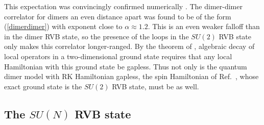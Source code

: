 \documentclass[11pt]{iopart}
\begin{document}
This expectation was convincingly confirmed numerically \cite{RVB1,RVB2}. The dimer-dimer correlator for dimers an even distance apart was found to be of the form (\ref{dimerdimer}) with
exponent close to $\alpha \approx 1.2$. This is an even weaker falloff than in the dimer RVB state, so the presence of the loops in the $SU(2)$ RVB state only makes this correlator longer-ranged. By the theorem of \cite{Hastings_thm}, algebraic decay of local operators in a two-dimensional ground state requires that any local Hamiltonian with this ground state be gapless. Thus not only is the quantum dimer model with RK Hamiltonian gapless,  the spin Hamiltonian of Ref.~\cite{Cano}, whose exact ground state is the $SU(2)$ RVB state, must be as well.

\subsection{The $SU(N)$ RVB state}
\end{document}
